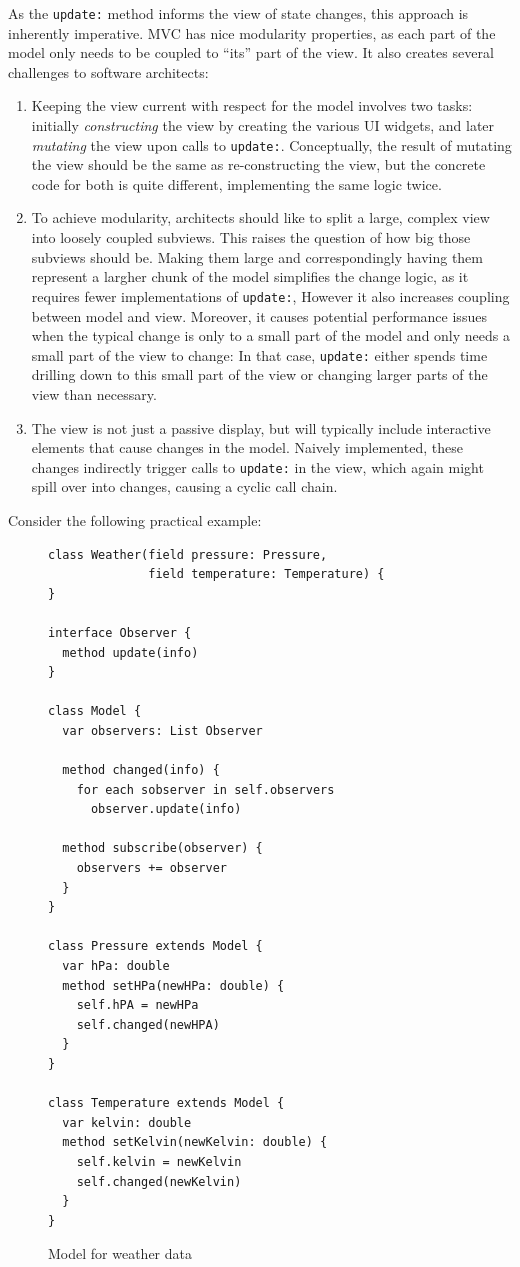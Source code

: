 \documentclass[sigplan,screen]{acmart}
\begin{document}
As the \texttt{update:} method informs the view of state changes, this
approach is inherently imperative.  MVC has nice modularity
properties, as each part of the model only needs to be coupled to
``its'' part of the view.  It also creates several challenges to
software architects:
\label{sec:challenges}
%
\begin{enumerate}
\item Keeping the view current with respect for the model involves two
  tasks: initially \emph{constructing} the view by creating the
  various UI widgets, and later \emph{mutating} the view upon calls to
  \texttt{update:}.  Conceptually, the result of mutating the view
  should be the same as re-constructing the view, but the concrete
  code for both is quite different, implementing the same logic twice.
\item To achieve modularity, architects should like to split a large,
  complex view into loosely coupled subviews.  This raises the
  question of how big those subviews should be. Making them large and
  correspondingly having them represent a largher chunk of the model
  simplifies the change logic, as it requires fewer implementations of
  \texttt{update:}, However it also increases coupling between model
  and view.  Moreover, it causes potential performance issues when the
  typical change is only to a small part of the model and only needs a
  small part of the view to change: In that case, \texttt{update:}
  either spends time drilling down to this small part of the view or
  changing larger parts of the view than necessary.
\item The view is not just a passive display, but will typically
  include interactive elements that cause changes in the model.
  Naively implemented, these changes indirectly trigger calls to
  \texttt{update:} in the view, which again might spill over into
  changes, causing a cyclic call chain.
\end{enumerate}
%
Consider the following practical example:
%

\begin{figure}[tb]
\begin{verbatim}
class Weather(field pressure: Pressure,
              field temperature: Temperature) {
}

interface Observer {
  method update(info)
}

class Model {
  var observers: List Observer

  method changed(info) {
    for each sobserver in self.observers
      observer.update(info)

  method subscribe(observer) {
    observers += observer
  }
}

class Pressure extends Model {
  var hPa: double
  method setHPa(newHPa: double) {
    self.hPA = newHPa
    self.changed(newHPA)
  }
}

class Temperature extends Model {
  var kelvin: double
  method setKelvin(newKelvin: double) {
    self.kelvin = newKelvin
    self.changed(newKelvin)
  }
}
\end{verbatim}
  \caption{Model for weather data}
  \label{fig:weather-model}
\end{figure}
\end{document}
